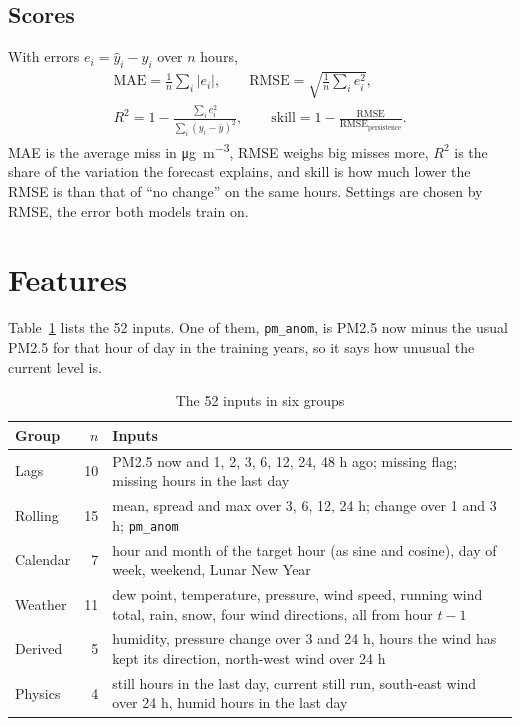 \documentclass[conference]{IEEEtran}
\newcommand{\ugm}{\si{\micro\gram\per\cubic\metre}}
\newcommand{\col}[1]{\texttt{#1}}
\begin{document}
\subsection{Scores}
With errors $e_i = \hat{y}_i - y_i$ over $n$ hours,
\begin{gather}
\text{MAE} = \frac{1}{n}\sum_i |e_i|, \qquad \text{RMSE} = \sqrt{\frac{1}{n}\sum_i e_i^2}, \\
R^2 = 1 - \frac{\sum_i e_i^2}{\sum_i (y_i - \bar{y})^2}, \qquad \text{skill} = 1 - \frac{\text{RMSE}}{\text{RMSE}_{\text{persistence}}}.
\end{gather}
MAE is the average miss in \ugm, RMSE weighs big misses more, $R^2$ is the share of the variation the forecast explains, and skill is how much lower the RMSE is than that of ``no change'' on the same hours. Settings are chosen by RMSE, the error both models train on.

\section{Features}
\label{sec:features}
Table~\ref{tab:features} lists the 52 inputs. One of them, \col{pm\_anom}, is PM2.5 now minus the usual PM2.5 for that hour of day in the training years, so it says how unusual the current level is.

\begin{table}[!htb]
\centering
\caption{The 52 inputs in six groups}
\label{tab:features}
\begin{tabular}{@{}lrp{}@{}}
\toprule
Group & $n$ & Inputs \\
\midrule
Lags & 10 & PM2.5 now and 1, 2, 3, 6, 12, 24, 48 h ago; missing flag; missing hours in the last day \\
Rolling & 15 & mean, spread and max over 3, 6, 12, 24 h; change over 1 and 3 h; \col{pm\_anom} \\
Calendar & 7 & hour and month of the target hour (as sine and cosine), day of week, weekend, Lunar New Year \\
Weather & 11 & dew point, temperature, pressure, wind speed, running wind total, rain, snow, four wind directions, all from hour $t-1$ \\
Derived & 5 & humidity, pressure change over 3 and 24 h, hours the wind has kept its direction, north-west wind over 24 h \\
Physics & 4 & still hours in the last day, current still run, south-east wind over 24 h, humid hours in the last day \\
\bottomrule
\end{tabular}
\end{table}
\end{document}
